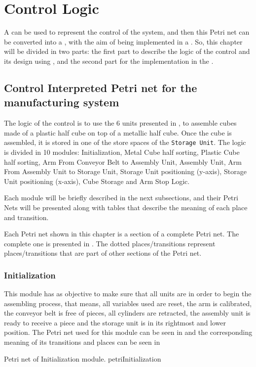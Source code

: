 
\chapter{Control Logic}
\label{cha:control}

A \CIPN{} can be used to
represent the control of the system, and then this Petri net can be converted
into a \LD, with the aim of being implemented in a \PLC. So, this chapter will be
divided in two parts: the first part to describe the logic of the control and
its design using \CIPN, and the second part for the implementation in the \PLC.
\section{Control Interpreted Petri net for the manufacturing system}
\label{sec:logic}
The logic of the control is to use the 6 units presented in
, to assemble cubes made of a plastic half cube on top of a
metallic half cube. Once the cube is assembled, it is stored in one of
the store spaces of the \verb|Storage Unit|. 
The logic is divided in 10 modules:
 Initialization, Metal Cube half sorting, Plastic Cube half sorting, Arm From
 Conveyor Belt to Assembly Unit, Assembly Unit, Arm From Assembly Unit to
 Storage Unit, Storage Unit positioning (y-axis), Storage Unit positioning (x-axis), Cube Storage and Arm Stop Logic.

Each module will be briefly described in the next subsections, and their Petri
Nets will be presented along with tables that describe the meaning of each place
and transition.

\begin{observation}
  Each Petri net shown in this chapter is a section of a complete Petri net.
 The complete one is presented in . The dotted
  places\slash transitions represent places\slash transitions that are part of
  other sections of the Petri net.
\end{observation}
\subsection{Initialization}
This module has as objective to make sure that all units are in order to begin
the assembling process, that means, all variables used are reset, the arm is
calibrated, the conveyor belt is free of pieces, all cylinders are retracted,
the assembly unit is ready to receive a piece and the storage unit is in its
rightmost and lower position. The Petri net used for this module can be seen in
 and the corresponding meaning of its
transitions and places can be seen in 


{Petri net of Initialization module.}
{petriInitialization}

